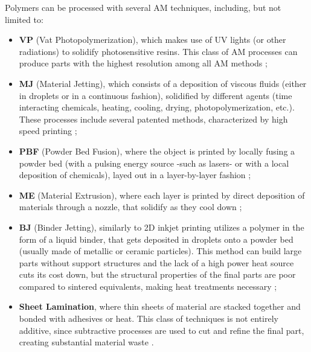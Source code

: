 \documentclass{article}
\begin{document}
    Polymers can be processed with several AM techniques, including, but not limited to: 

    \begin{itemize}
        \item \textbf{VP} (Vat Photopolymerization), which makes use of UV lights (or other radiations) to solidify photosensitive resins. This class of AM processes can produce 
                        parts with the highest resolution among all AM methods \autocites*{Recent_progress_polymers_AM}{Kovalcik_PHA_Review};
        \item \textbf{MJ} (Material Jetting), which consists of a deposition of viscous fluids (either in droplets or in a continuous fashion), solidified by different agents 
                            (time interacting chemicals, heating, cooling, drying, photopolymerization, etc.). These processes include several patented methods, characterized by 
                            high speed printing \autocite*{Recent_progress_polymers_AM};
        \item \textbf{PBF} (Powder Bed Fusion), where the object is printed by locally fusing a powder bed (with a pulsing energy source -such as lasers- or with a local deposition of chemicals),
                            layed out in a layer-by-layer fashion \autocites*{Recent_progress_polymers_AM}{Kovalcik_PHA_Review};
        \item \textbf{ME} (Material Extrusion), where each layer is printed by direct deposition of materials through a nozzle, that solidify as they cool down \autocites*{Recent_progress_polymers_AM}{Kovalcik_PHA_Review};
        \item \textbf{BJ} (Binder Jetting), similarly to 2D inkjet printing utilizes a
                        polymer in the form of a liquid binder, that gets deposited in droplets onto a powder bed (usually made of metallic or ceramic particles). This 
                        method can build large parts without support structures and the lack of a high power heat source cuts its cost down, but the structural 
                        properties of the final parts are poor compared to sintered equivalents, making heat treatments necessary \autocite*{Recent_progress_polymers_AM};
        \item \textbf{Sheet Lamination}, where thin sheets of material are stacked together and bonded with adhesives or heat. This class of techniques 
                        is not entirely additive, since subtractive processes are used to cut and refine the final part, creating substantial material waste \autocite*{Recent_progress_polymers_AM}.
    \end{itemize} \clearpage
\end{document}
